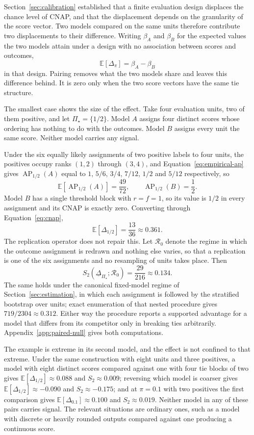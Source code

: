\documentclass[11pt]{article}
\newcommand{\AP}{\operatorname{AP}}
\newcommand{\Regime}{\mathcal{R}}
\newcommand{\PSet}{\Pi_\star}
\newcommand{\E}{\mathbb{E}}
\newcommand{\RobDelta}{\underline{\Delta}_{\PSet}}
\theoremstyle{remark}
\begin{document}
Section~\ref{sec:calibration} established that a finite evaluation design displaces the chance level of CNAP, and that the displacement depends on the granularity of the score vector. Two models compared on the same units therefore contribute two displacements to their difference. Writing $\beta_A$ and $\beta_B$ for the expected values the two models attain under a design with no association between scores and outcomes,
\[
\E[\Delta_\pi]
=
\beta_A-\beta_B
\]
in that design. Pairing removes what the two models share and leaves this difference behind. It is zero only when the two score vectors have the same tie structure.

The smallest case shows the size of the effect. Take four evaluation units, two of them positive, and let $\PSet=\{1/2\}$. Model $A$ assigns four distinct scores whose ordering has nothing to do with the outcomes. Model $B$ assigns every unit the same score. Neither model carries any signal.

Under the six equally likely assignments of two positive labels to four units, the positives occupy ranks $(1,2)$ through $(3,4)$, and Equation~\eqref{eq:empirical-ap} gives $\AP_{1/2}(A)$ equal to $1$, $5/6$, $3/4$, $7/12$, $1/2$ and $5/12$ respectively, so
\[
\E\left[\AP_{1/2}(A)\right]=\frac{49}{72},
\qquad
\AP_{1/2}(B)=\frac12 .
\]
Model $B$ has a single threshold block with $r=f=1$, so its value is $1/2$ in every assignment and its CNAP is exactly zero. Converting through Equation~\eqref{eq:cnap},
\[
\E\left[\Delta_{1/2}\right]
=
\frac{13}{36}
\approx
0.361 .
\]
The replication operator does not repair this. Let $\Regime_0$ denote the regime in which the outcome assignment is redrawn and nothing else varies, so that a replication is one of the six assignments and no resampling of units takes place. Then
\[
S_2(\RobDelta;\Regime_0)
=
\frac{29}{216}
\approx
0.134 .
\]
The same holds under the canonical fixed-model regime of Section~\ref{sec:estimation}, in which each assignment is followed by the stratified bootstrap over units; exact enumeration of that nested procedure gives $719/2304\approx0.312$. Either way the procedure reports a supported advantage for a model that differs from its competitor only in breaking ties arbitrarily. Appendix~\ref{app:paired-null} gives both computations.

The example is extreme in its second model, and the effect is not confined to that extreme. Under the same construction with eight units and three positives, a model with eight distinct scores compared against one with four tie blocks of two gives $\E[\Delta_{1/2}]\approx0.088$ and $S_2\approx0.009$; reversing which model is coarser gives $\E[\Delta_{1/2}]\approx-0.090$ and $S_2\approx-0.175$; and at $\pi=0.1$ with two positives the first comparison gives $\E[\Delta_{0.1}]\approx0.100$ and $S_2\approx0.019$. Neither model in any of these pairs carries signal. The relevant situations are ordinary ones, such as a model with discrete or heavily rounded outputs compared against one producing a continuous score.
\end{document}
